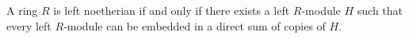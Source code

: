 A ring $R$ is left noetherian if and only if there exists a left $R$-module $H$ such that every left $R$-module can be embedded in a direct sum of copies of $H$.
